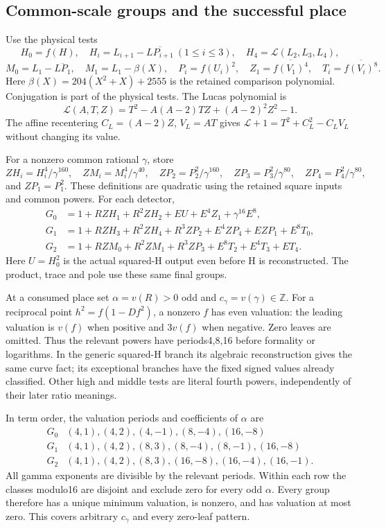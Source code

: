 \subsection{Common-scale groups and the successful place}\label{subsec:v14-groups}
Use the physical tests
\[
 H_0=f(H),\quad H_i=L_{i+1}-\overline{LP_{i+1}}\ (1\leq i\leq3),
 \quad H_4=\mathcal L(L_2,L_3,L_4),
\]
\[
 M_0=L_1-\overline{LP_1},\quad M_1=L_1-\beta(X),\quad
 P_i=f(U_i)^2,\quad Z_1=\overline{f(V_1)^4},\quad
 T_i=\overline{f(V_i)^8}.
\]
Here $\beta(X)=204(X^2+X)+2555$ is the retained comparison
polynomial. Conjugation is part of the physical tests.
The Lucas polynomial is
\[
 \mathcal L(A,T,Z)=T^2-A(A-2)TZ+(A-2)^2Z^2-1.
\]
The affine recentering $C_L=(A-2)Z$, $V_L=AT$ gives
$\mathcal L+1=T^2+C_L^2-C_LV_L$ without changing its value.

For a nonzero common rational $\gamma$, store
\[
 ZH_i=H_i^4/\gamma^{160},\quad ZM_i=M_i^4/\gamma^{40},\quad
 ZP_2=P_2^2/\gamma^{160},\quad
 ZP_3=P_3^2/\gamma^{80},\quad ZP_4=P_4^2/\gamma^{80},
\]
and $ZP_1=P_1^2$. These definitions are quadratic using the
retained square inputs and common powers. For each detector,
\begin{align}
 G_0&=1+RZH_1+R^2ZH_2+EU+E^4Z_1+\gamma^{16}E^8,\label{eq:v14-g0}\\
 G_1&=1+RZH_3+R^2ZH_4+R^3ZP_2+E^4ZP_4+EZP_1+E^8T_0,\label{eq:v14-g1}\\
 G_2&=1+RZM_0+R^2ZM_1+R^3ZP_3+E^8T_2+E^4T_3+ET_4.\label{eq:v14-g2}
\end{align}
Here $U=H_0^2$ is the actual squared-H output even before
H is reconstructed. The product, trace and pole use these
same final groups.

At a consumed place set $\alpha=v(R)>0$ odd and
$c_\gamma=v(\gamma)\in\mathbb Z$. For a reciprocal point
$h^2=f(1-Df^2)$, a nonzero $f$ has even valuation: the leading
valuation is $v(f)$ when positive and $3v(f)$ when negative.
Zero leaves are omitted. Thus the relevant powers have
periods4,8,16 before formality or logarithms. In the generic
squared-H branch its algebraic reconstruction gives the same
curve fact; its exceptional branches have the fixed signed
values already classified. Other high and middle tests are
literal fourth powers, independently of their later ratio meanings.

In term order, the valuation periods and coefficients of
$\alpha$ are
\[
 \begin{array}{c|l}
 G_0&(4,1),(4,2),(4,-1),(8,-4),(16,-8)\\
 G_1&(4,1),(4,2),(8,3),(8,-4),(8,-1),(16,-8)\\
 G_2&(4,1),(4,2),(8,3),(16,-8),(16,-4),(16,-1).
 \end{array}
\]
All gamma exponents are divisible by the relevant periods.
Within each row the classes modulo16 are disjoint and exclude
zero for every odd $\alpha$. Every group therefore has a unique
minimum valuation, is nonzero, and has valuation at most zero.
This covers arbitrary $c_\gamma$ and every zero-leaf pattern.

